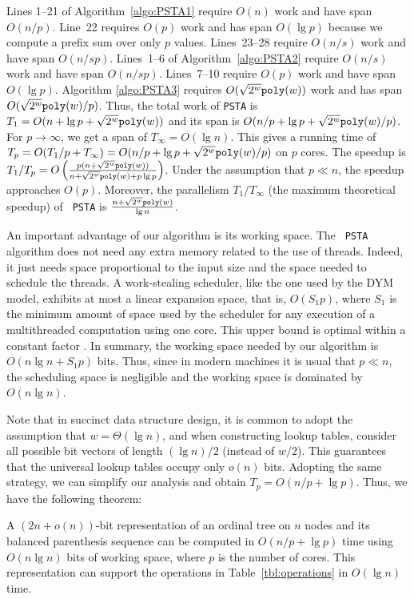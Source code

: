 Lines 1--21 of Algorithm~\ref{algo:PSTA1} require $O(n)$ work and have
span~$O(n/p)$.
Line~22 requires $O(p)$ work and has span $O(\lg p)$ because we compute
a prefix sum over only $p$ values.
Lines~23--28 require $O(n/s)$ work and have span $O(n/sp)$.
Lines~1--6 of Algorithm~\ref{algo:PSTA2} require $O(n/s)$ work and have
span $O(n/sp)$.
Lines~7--10 require $O(p)$ work and have span $O(\lg p)$.
Algorithm \ref{algo:PSTA3} requires $O(\sqrt{2^w}\mathtt{poly}(w))$ work and
has span $O(\sqrt{2^{w}}\mathtt{poly}(w)/p)$.
Thus, the total work of {\tt PSTA} is $T_1 = O(n + \lg p + \sqrt{2^w}\mathtt{poly}(w))$
and its span is $O(n/p + \lg p + \sqrt{2^w}\mathtt{poly}(w)/p)$.
For $p \rightarrow \infty$, we get a span of $T_\infty = O(\lg n)$.
This gives a running time of $T_p = O(T_1/p + T_\infty) =
O(n/p + \lg p + \sqrt{2^w}\mathtt{poly}(w)/p)$ on $p$ cores.
The speedup is $T_1/T_p = O\left(\frac{p(n+\sqrt{2^{w}}\mathtt{poly}(w))}{n+\sqrt{2^{w}}\mathtt{poly}(w)+p\lg
p}\right)$. Under the assumption that $p\ll n$, the speedup approaches
$O(p)$. Moreover, the
parallelism $T_1/T_{\infty}$ (the maximum theoretical speedup) of {\tt
PSTA} is $\frac{n+\sqrt{2^{w}}\mathtt{poly}(w)}{\lg n}$.

An important advantage of our algorithm is its working space. The {\tt
PSTA} algorithm does not need any extra memory related to the use of
threads. Indeed, it just needs space proportional to the input size
and the space needed to schedule the threads. A work-stealing
scheduler, like the one used by the DYM model, exhibits at most a
linear expansion space, that is, $O(S_1p)$, where $S_1$ is the minimum
amount of space used by the scheduler for any execution of a
multithreaded computation using one core. This upper bound is
optimal within a constant factor
\cite{Blumofe:1999:SMC:324133.324234}. In summary, the working space
needed by our algorithm is $O(n\lg n+S_1p)$ bits. Thus, since in modern
machines it is usual that $p\ll n$, the scheduling space is negligible
and the working space is dominated by $O(n\lg n)$.

Note that in succinct data structure design, it is common to adopt the assumption that $w = \Theta(\lg n)$, and when constructing lookup tables, consider all possible bit vectors of length $(\lg n)/2$ (instead of $w/2$).
This guarantees that the universal lookup tables occupy only $o(n)$ bits.
Adopting the same strategy, we can simplify our analysis and obtain
$T_p = O(n/p + \lg p)$.
Thus, we have the following theorem:
\begin{theorem}\label{lem:lg}
A $(2n+o(n))$-bit representation of an ordinal tree on $n$ nodes and its balanced parenthesis sequence can be computed in $O(n/p + \lg p)$ time using $O(n\lg n)$ bits of working space, where $p$ is the number of cores.
This representation can support the operations in Table~\ref{tbl:operations} in $O(\lg n)$ time.
\end{theorem}